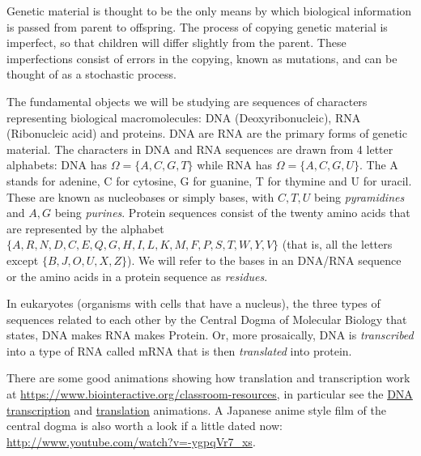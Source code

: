 \documentclass[11pt]{article}
\begin{document}
Genetic material is thought to be the only means by which biological information is passed from parent to offspring.  The process of copying genetic material is imperfect, so that children will differ slightly from the parent.  These imperfections consist of errors in the copying, known as mutations, and can be thought of as a stochastic process.

The fundamental objects we will be studying are sequences of characters representing biological macromolecules: DNA (Deoxyribonucleic),   RNA  (Ribonucleic acid) and proteins.  DNA are RNA are the primary forms of genetic material.    The characters in DNA and RNA sequences are drawn from 4 letter alphabets: DNA has $\Omega = \{A,C,G,T \}$ while RNA has $\Omega = \{A,C,G,U \}$.  The A stands for adenine, C for cytosine, G for guanine, T for thymine and U for uracil. These are known as nucleobases or simply bases, with $C,T,U$ being {\em pyramidines } and $A,G$ being {\em purines}.    Protein sequences consist of the twenty amino acids that are represented by the alphabet $\{ A,R,N,D,C,E,Q,G,H,I,L,K,M,F,P,S,T,W,Y,V\}$ (that is, all the letters except $\{ B,J,O,U,X,Z \}$). We will refer to the bases in an DNA/RNA sequence or the amino acids in a protein sequence as {\em residues}. 

In eukaryotes (organisms with cells that  have a nucleus), the three types of sequences related to each other by the Central Dogma of  Molecular Biology that states, DNA makes RNA makes Protein.  Or, more prosaically,   DNA is {\em transcribed} into a type of RNA called mRNA that is then {\em translated} into protein.  

There are some good animations showing how translation and transcription work at \url{https://www.biointeractive.org/classroom-resources}, in particular see the  \href{https://www.biointeractive.org/classroom-resources/dna-transcription-basic-detail}{DNA transcription} and  \href{https://www.biointeractive.org/classroom-resources/translation-basic-detail}{translation} animations.  A Japanese anime style film of the central dogma is also worth a look if a little dated now: \url{http://www.youtube.com/watch?v=-ygpqVr7_xs}. 
\end{document}
